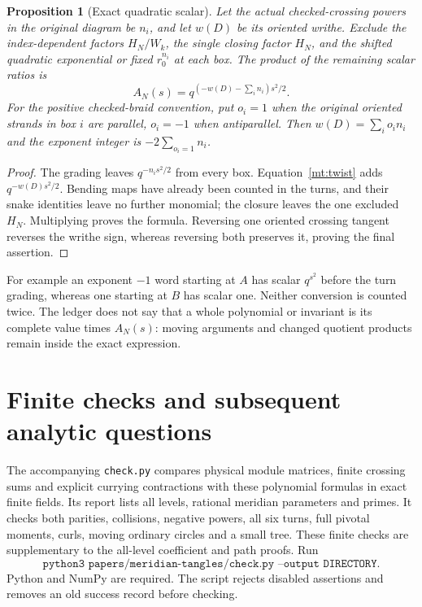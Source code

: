 \documentclass[11pt]{article}
\numberwithin{equation}{section}
\newtheorem{proposition}[theorem]{Proposition}
\theoremstyle{definition}\newtheorem{definition}[theorem]{Definition}
\theoremstyle{remark}\newtheorem{remark}[theorem]{Remark}
\begin{document}
\begin{proposition}[Exact quadratic scalar]\label{mt:scalar}
Let the actual checked-crossing powers in the original diagram be
$n_i$, and let $w(D)$ be its oriented writhe. Exclude the
index-dependent factors $H_N/W_k$, the single closing factor $H_N$,
and the shifted quadratic exponential or fixed $r_0^{n_i}$ at each box. The product
of the remaining scalar ratios is
\begin{equation}\label{mt:scalar-value}
 A_N(s)=q^{(-w(D)-\sum_i n_i)s^2/2}.
\end{equation}
For the positive checked-braid convention, put $o_i=1$ when the
original oriented strands in box $i$ are parallel, $o_i=-1$ when
antiparallel. Then $w(D)=\sum_i o_i n_i$ and the exponent integer
is $-2\sum_{o_i=1}n_i$.
\end{proposition}
\begin{proof}
The grading leaves $q^{-n_i s^2/2}$ from every box.
Equation~\eqref{mt:twist} adds $q^{-w(D)s^2/2}$.
Bending maps have already been counted in the turns, and their
snake identities leave no further monomial; the closure leaves
the one excluded $H_N$. Multiplying proves the formula.
Reversing one oriented crossing tangent reverses the writhe sign,
whereas reversing both preserves it, proving the final assertion.
\end{proof}
For example an exponent $-1$ word starting at $A$ has scalar
$q^{s^2}$ before the turn grading, whereas one starting at $B$
has scalar one. Neither conversion is counted twice. The ledger
does not say that a whole polynomial or invariant is its complete
value times $A_N(s)$: moving arguments and changed quotient
products remain inside the exact expression.

\section{Finite checks and subsequent analytic questions}
The accompanying \texttt{check.py} compares physical module
matrices, finite crossing sums and explicit currying contractions
with these polynomial formulas in exact finite fields. Its report
lists all levels, rational meridian parameters and primes. It
checks both parities, collisions, negative powers, all six turns,
full pivotal moments, curls, moving ordinary circles and a small tree. These finite checks are
supplementary to the all-level coefficient and path proofs. Run
\[
 \texttt{python3 papers/meridian-tangles/check.py --output DIRECTORY}.
\]
Python and NumPy are required. The script rejects disabled
assertions and removes an old success record before checking.
\end{document}

